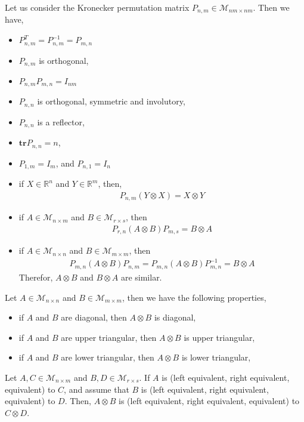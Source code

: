 \begin{proposition}
Let us consider the Kronecker permutation matrix $P_{n,m} \in  \mathcal{M}_{nm \times nm}$. Then we have,
\begin{itemize}
\item $P_{n,m}^T=P_{n,m}^{-1}=P_{m,n}$
\item $P_{n,m}$ is orthogonal,
\item $P_{n,m} P_{m,n} =I_{nm}$
\item $P_{n,n}$ is orthogonal, symmetric and involutory,
\item $P_{n,n}$ is a reflector,
\item $\mathbf{tr} P_{n,n} = n$,
\item $P_{1,m}=I_{m}$, and $P_{n,1}=I_{n}$
\item if $X \in \mathbb{R}^{n}$ and $Y \in \mathbb{R}^{m}$, then,
\begin{align}
P_{n,m} ( Y \otimes X ) = X \otimes Y
\end{align}
\item if $A \in \mathcal{M}_{n \times m}$ and $B \in \mathcal{M}_{r \times s}$, then
\begin{align}
P_{r,n} ( A \otimes B ) P_{m,s} = B \otimes A
\end{align}
\item if $A \in \mathcal{M}_{n \times n}$ and $B \in \mathcal{M}_{m \times m}$, then
\begin{align}
P_{m,n} ( A \otimes B ) P_{n,m} =  P_{m,n} ( A \otimes B ) P_{m,n}^{-1} = B \otimes A
\end{align}
Therefor, $A \otimes B$ and $B \otimes A$ are similar.
\end{itemize}
\end{proposition}

\begin{proposition}
Let $A \in \mathcal{M}_{n \times n}$ and $B \in \mathcal{M}_{m \times m}$, then we have the following properties,
\begin{itemize}
\item if $A$ and $B$ are diagonal, then $A\otimes B$ is diagonal,
\item if $A$ and $B$ are upper triangular, then $A\otimes B$ is upper triangular,
\item if $A$ and $B$ are lower triangular, then $A\otimes B$ is lower triangular,
\end{itemize}
\end{proposition}

\begin{proposition}
Let $A,C \in \mathcal{M}_{n \times m}$ and $B,D \in \mathcal{M}_{r \times s}$. If $A$ is (left equivalent, right equivalent, equivalent) to $C$, and assume that $B$ is (left equivalent, right equivalent, equivalent) to $D$. Then, $A \otimes B$ is (left equivalent, right equivalent, equivalent) to $C \otimes D$.
\end{proposition}

